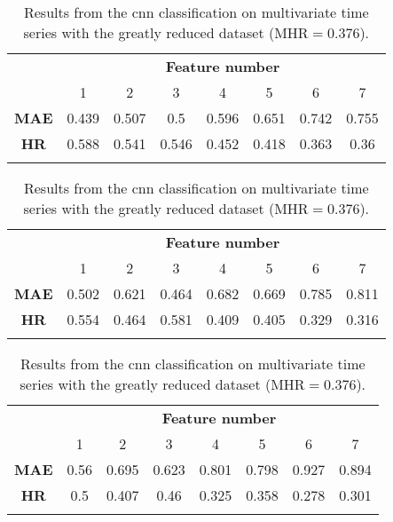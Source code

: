 \begin{table}
    \begin{center}
        \caption{\label{tab:4cat:comp} Results from the \ac{cnn} classification on multivariate time series with the complete dataset (\(\text{MHR} = 0.467\)).}
        \begin{tabular}{ >{\bfseries}c c c c c c c c }
            \multirow{2}{*}{\textbf{Measure}} & \multicolumn{7}{c}{\textbf{Feature number}} \\
            & 1 & 2 & 3 & 4 & 5 & 6 & 7 \\
            \midrule
            MAE & 0.439 & 0.507 & 0.5 & 0.596 & 0.651 & 0.742 & 0.755 \\
            HR  & 0.588 & 0.541 & 0.546 & 0.452 & 0.418 & 0.363 & 0.36 \\
            \\
        \end{tabular}

        \caption{\label{tab:4cat:red} Results from the \ac{cnn} classification on multivariate time series with the reduced dataset (\(\text{MHR} = 0.437\)).}
        \begin{tabular}{ >{\bfseries}c c c c c c c c }
            \multirow{2}{*}{\textbf{Measure}} & \multicolumn{7}{c}{\textbf{Feature number}} \\
            & 1 & 2 & 3 & 4 & 5 & 6 & 7 \\
            \midrule
            MAE & 0.502 & 0.621 & 0.464 & 0.682 & 0.669 & 0.785 & 0.811 \\
            HR  & 0.554 & 0.464 & 0.581 & 0.409 & 0.405 & 0.329 & 0.316 \\
            \\
        \end{tabular}

        \caption{\label{tab:4cat:vred} Results from the \ac{cnn} classification on multivariate time series with the greatly reduced dataset (\(\text{MHR} = 0.376\)).}
        \begin{tabular}{ >{\bfseries}c c c c c c c c }
            \multirow{2}{*}{\textbf{Measure}} & \multicolumn{7}{c}{\textbf{Feature number}} \\
            & 1 & 2 & 3 & 4 & 5 & 6 & 7 \\
            \midrule
            MAE & 0.56 & 0.695 & 0.623 & 0.801 & 0.798 & 0.927 & 0.894 \\
            HR  & 0.5 & 0.407 & 0.46 & 0.325 & 0.358 & 0.278 & 0.301 \\
            \\
        \end{tabular}
    \end{center}
\end{table}

